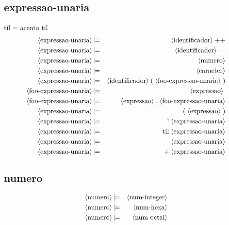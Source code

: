 \documentclass[12pt,a4papper]{article}
\newcommand{\pn}[1]{\langle \textnormal{#1} \rangle}
\newcommand{\pp}{\models}
\newcommand{\ww}{\;}
\newcommand{\sm}[1]{\textnormal{#1}}
\begin{document}
\begin{landscape}
\subsection{expressao-unaria}
til = acento til
\begin{eqnarray}
        \pn{expressao-unaria} &\pp& \pn{identificador}  \ww  \sm{++} \\
        \pn{expressao-unaria} &\pp& \pn{identificador}  \ww  \sm{- -} \\
        \pn{expressao-unaria} &\pp& \pn{numero} \\
        \pn{expressao-unaria} &\pp& \pn{caracter} \\
        \pn{expressao-unaria} &\pp& \pn{identificador} \ww \sm{(} \ww \pn{foo-expressao-unaria} \ww \sm{)} \\
   \pn{foo-expressao-unaria}  &\pp& \pn{expressao} \ww \\
   \pn{foo-expressao-unaria}  &\pp& \pn{expressao} \ww \sm{,} \ww \pn{foo-expressao-unaria} \\
       \pn{expressao-unaria}  &\pp& \sm{(}  \ww   \pn{expressao}   \ww  \sm{)} \\
       \pn{expressao-unaria}  &\pp& \sm{!}  \ww  \pn{expressao-unaria} \\
       \pn{expressao-unaria}  &\pp& \sm{til}  \ww  \pn{expressao-unaria} \\
       \pn{expressao-unaria}  &\pp& \sm{$-$}  \ww  \pn{expressao-unaria} \\
       \pn{expressao-unaria}  &\pp& \sm{$+$}  \ww  \pn{expressao-unaria} 
      \end{eqnarray}


\subsection{numero}
\begin{eqnarray}
        \pn{numero} &\pp& \pn{num-integer} \\
        \pn{numero} &\pp& \pn{num-hexa} \\
        \pn{numero} &\pp& \pn{num-octal} 
\end{eqnarray}

\end{landscape}
\end{document}

